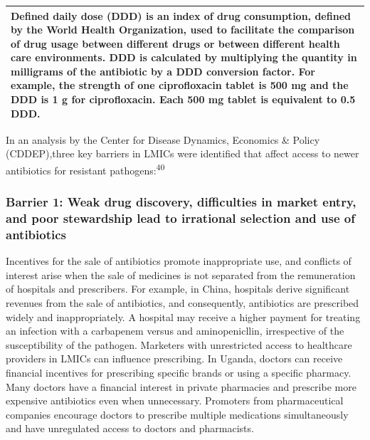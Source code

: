 \documentclass[
  11pt,
  paper=a4,
  ,captions=tableheading
]{scrartcl}
\begin{document}
\begin{longtable}[]{@{}
  >{\raggedright\arraybackslash}p{}@{}}
\toprule
\endhead
Defined daily dose (DDD) is an index of drug consumption, defined by the
World Health Organization, used to facilitate the comparison of drug
usage between different drugs or between different health care
environments. DDD is calculated by multiplying the quantity in
milligrams of the antibiotic by a DDD conversion factor. For example,
the strength of one ciprofloxacin tablet is 500 mg and the DDD is 1 g
for ciprofloxacin. Each 500 mg tablet is equivalent to 0.5 DDD. \\
\bottomrule
\end{longtable}

In an analysis by the Center for Disease Dynamics, Economics \& Policy
(CDDEP),three key barriers in LMICs were identified that affect access
to newer antibiotics for resistant pathogens:\textsuperscript{40}

\hypertarget{barrier-1-weak-drug-discovery-difficulties-in-market-entry-and-poor-stewardship-lead-to-irrational-selection-and-use-of-antibiotics}{%
\subsubsection*{Barrier 1: Weak drug discovery, difficulties in market
entry, and poor stewardship lead to irrational selection and use of
antibiotics}\label{barrier-1-weak-drug-discovery-difficulties-in-market-entry-and-poor-stewardship-lead-to-irrational-selection-and-use-of-antibiotics}}

Incentives for the sale of antibiotics promote inappropriate use, and
conflicts of interest arise when the sale of medicines is not separated
from the remuneration of hospitals and prescribers. For example, in
China, hospitals derive significant revenues from the sale of
antibiotics, and consequently, antibiotics are prescribed widely and
inappropriately. A hospital may receive a higher payment for treating an
infection with a carbapenem versus and aminopenicllin, irrespective of
the susceptibility of the pathogen. Marketers with unrestricted access
to healthcare providers in LMICs can influence prescribing. In Uganda,
doctors can receive financial incentives for prescribing specific brands
or using a specific pharmacy. Many doctors have a financial interest in
private pharmacies and prescribe more expensive antibiotics even when
unnecessary. Promoters from pharmaceutical companies encourage doctors
to prescribe multiple medications simultaneously and have unregulated
access to doctors and pharmacists.
\end{document}

